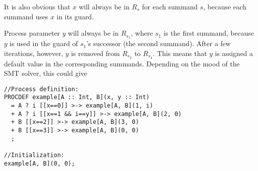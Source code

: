 It is also obvious that $x$ will always be in $R_s$ for each summand $s$, because each summand uses $x$ in its guard.

Process parameter $y$ will always be in $R_{s_1}$, where $s_1$ is the first summand, because $y$ is used in the guard of $s_1$'s successor (the second summand).
After a few iterations, however, $y$ is removed from $R_{s_2}$ to $R_{s_4}$.
This means that $y$ is assigned a default value in the corresponding summands.
Depending on the mood of the SMT solver, this could give

\begin{lstlisting}
//Process definition:
PROCDEF example[A :: Int, B](x, y :: Int)
  = A ? i [[x==0]] >-> example[A, B](1, i)
  + A ? i [[x==1 && i==y]] >-> example[A, B](2, 0)
  + B [[x==2]] >-> example[A, B](3, 0)
  + B [[x==3]] >-> example[A, B](0, 0)
  ;

//Initialization:
example[A, B](0, 0);
\end{lstlisting}




